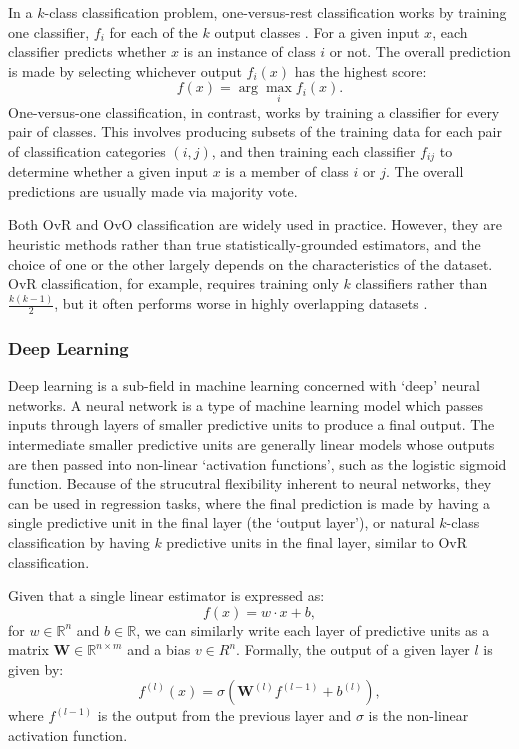 \documentclass{report}
\begin{document}
In a $k$-class classification problem, one-versus-rest classification works by training one classifier, $f_i$ for each of the $k$ output classes \cite{bishop2006pattern}. For a given input $x$, each classifier predicts whether $x$ is an instance of class $i$ or not. The overall prediction is made by selecting whichever output $f_i(x)$ has the highest score:
\[
f(x) = \arg\max_i f_i(x).
\]
One-versus-one classification, in contrast, works by training a classifier for every pair of classes\cite{bishop2006pattern}. This involves producing subsets of the training data for each pair of classification categories $(i, j)$, and then training each classifier $f_{ij}$ to determine whether a given input $x$ is a member of class $i$ or $j$. The overall predictions are usually made via majority vote.

Both OvR and OvO classification are widely used in practice. However, they are heuristic methods rather than true statistically-grounded estimators, and the choice of one or the other largely depends on the characteristics of the dataset. OvR classification, for example, requires training only $k$ classifiers rather than $\frac{k (k - 1)}{2}$, but it often performs worse in highly overlapping datasets \cite{bishop2006pattern}.


\subsubsection{Deep Learning}

Deep learning is a sub-field in machine learning concerned with `deep' neural networks. A neural network is a type of machine learning model which passes inputs through layers of smaller predictive units to produce a final output\cite{goodfellow2016deep}. The intermediate smaller predictive units are generally linear models whose outputs are then passed into non-linear `activation functions', such as the logistic sigmoid function. Because of the strucutral flexibility inherent to neural networks, they can be used in regression tasks, where the final prediction is made by having a single predictive unit in the final layer (the `output layer'), or natural $k$-class classification by having $k$ predictive units in the final layer, similar to OvR classification.

Given that a single linear estimator is expressed as:
\[
f(x) = w \cdot x + b,
\]
for $w \in \mathbb R^n$ and $b \in \mathbb R$, we can similarly write each layer of predictive units as a matrix $\mathbf W \in \mathbb R^{n \times m}$ and a bias $v \in R^n$\cite{goodfellow2016deep}. Formally, the output of a given layer $l$ is given by:
\[
f^{(l)}(x) = \sigma (\mathbf W^{(l)}f^{(l - 1)} + b^{(l)}),
\]
where $f^{(l - 1)}$ is the output from the previous layer and $\sigma$ is the non-linear activation function.
\end{document}

